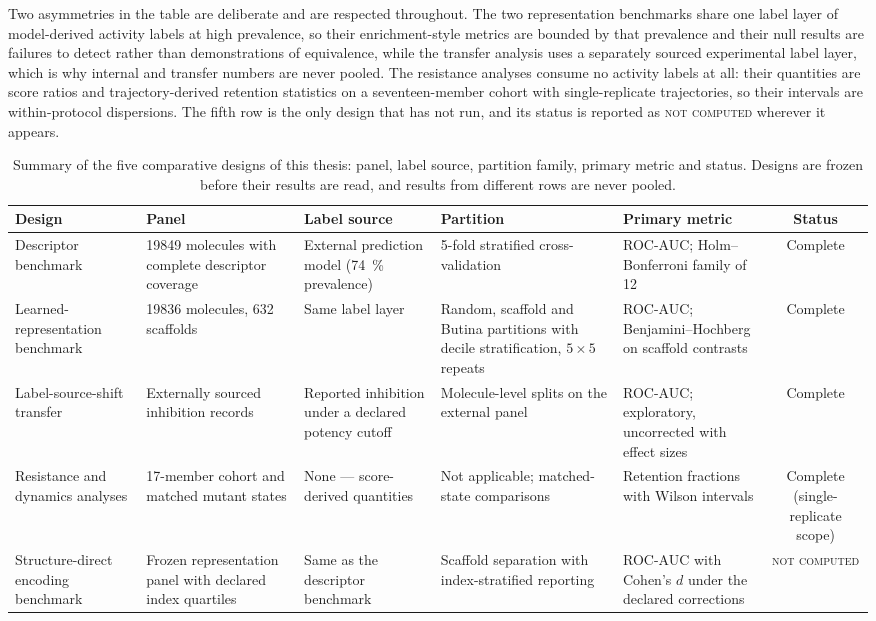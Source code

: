 Two asymmetries in the table are deliberate and are respected throughout. The two representation benchmarks share one label layer of model-derived activity labels at high prevalence, so their enrichment-style metrics are bounded by that prevalence and their null results are failures to detect rather than demonstrations of equivalence, while the transfer analysis uses a separately sourced experimental label layer, which is why internal and transfer numbers are never pooled. The resistance analyses consume no activity labels at all: their quantities are score ratios and trajectory-derived retention statistics on a seventeen-member cohort with single-replicate trajectories, so their intervals are within-protocol dispersions. The fifth row is the only design that has not run, and its status is reported as \textsc{not computed} wherever it appears.

\begin{table}[ht!]
	\centering
	\caption[Benchmark design summary]{Summary of the five comparative designs of this thesis: panel, label source, partition family, primary metric and status. Designs are frozen before their results are read, and results from different rows are never pooled.}
	\label{tab:met_benchmark_design}
	\small
	\begin{tabularx}{\textwidth}{X X X X X c}
		\toprule
		Design & Panel & Label source & Partition & Primary metric & Status \\
		\midrule
		Descriptor benchmark & \num{19849} molecules with complete descriptor coverage & External prediction model (\qty{74}{\percent} prevalence) & 5-fold stratified cross-validation & ROC-AUC; Holm--Bonferroni family of \num{12} & Complete \\
		Learned-representation benchmark & \num{19836} molecules, \num{632} scaffolds & Same label layer & Random, scaffold and Butina partitions with decile stratification, $5\times5$ repeats & ROC-AUC; Benjamini--Hochberg on scaffold contrasts & Complete \\
		Label-source-shift transfer & Externally sourced inhibition records & Reported inhibition under a declared potency cutoff & Molecule-level splits on the external panel & ROC-AUC; exploratory, uncorrected with effect sizes & Complete \\
		Resistance and dynamics analyses & \num{17}-member cohort and matched mutant states & None --- score-derived quantities & Not applicable; matched-state comparisons & Retention fractions with Wilson intervals & Complete (single-replicate scope) \\
		Structure-direct encoding benchmark & Frozen representation panel with declared index quartiles & Same as the descriptor benchmark & Scaffold separation with index-stratified reporting & ROC-AUC with Cohen's $d$ under the declared corrections & \textsc{not computed} \\
		\bottomrule
	\end{tabularx}
\end{table}

